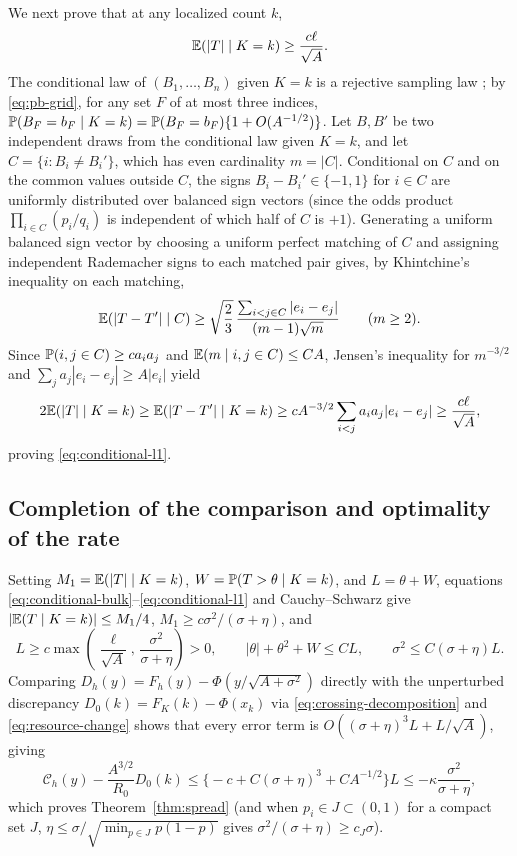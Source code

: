 We next prove that at any localized count $k$,
\begin{equation}\label{eq:conditional-l1}
                   \mathbb E(|T|\mid K=k)\ge \frac{c\ell}{\sqrt A}.
\end{equation}
The conditional law of $(B_1,\ldots,B_n)$ given $K=k$ is a rejective
sampling law \citep[Section~2]{BoistardLopuhaaRuizGazen2012}; by
\eqref{eq:pb-grid}, for any set $F$ of at most three indices,
$\mathbb P(B_F=b_F\mid K=k)=\mathbb P(B_F=b_F)\{1+O(A^{-1/2})\}$. Let $B,B'$ be two
independent draws from the conditional law given $K=k$, and let
$C=\{i:B_i\ne B_i'\}$, which has even cardinality $m=|C|$. Conditional on
$C$ and on the common values outside $C$, the signs $B_i-B_i'\in\{-1,1\}$ for
$i\in C$ are uniformly distributed over balanced sign vectors (since the
odds product $\prod_{i\in C}(p_i/q_i)$ is independent of which half of $C$ is
$+1$). Generating a uniform balanced sign vector by choosing a uniform
perfect matching of $C$ and assigning independent Rademacher signs to each
matched pair gives, by Khintchine's inequality on each matching,
\[
 \mathbb E(|T-T'|\mid C)
 \ge\sqrt{\frac23}\,
       \frac{\sum_{i<j\in C}|e_i-e_j|}{(m-1)\sqrt m}\qquad(m\ge2).
\]
Since $\mathbb P(i,j\in C)\ge ca_ia_j$ and $\mathbb E(m\mid i,j\in C)\le CA$, Jensen's
inequality for $m^{-3/2}$ and $\sum_ja_j|e_i-e_j|\ge A|e_i|$ yield
\[
 2\mathbb E(|T|\mid K=k)\ge\mathbb E(|T-T'|\mid K=k)
 \ge cA^{-3/2}\sum_{i<j}a_ia_j|e_i-e_j|
 \ge \frac{c\ell}{\sqrt A},
\]
proving \eqref{eq:conditional-l1}.

\subsection{Completion of the comparison and optimality of the rate}

Setting $M_1=\mathbb E(|T|\mid K=k)$, $W=\mathbb P(T>\theta\mid K=k)$, and $L=\theta+W$,
equations \eqref{eq:conditional-bulk}--\eqref{eq:conditional-l1} and Cauchy--Schwarz
give $|\mathbb E(T\mid K=k)|\le M_1/4$, $M_1\ge c\sigma^2/(\sigma+\eta)$, and
\begin{equation}\label{eq:relative-phase}
 L\ge c\max\left(\frac\ell{\sqrt A},\,
                      \frac{\sigma^2}{\sigma+\eta}\right)>0,
 \qquad |\theta|+\theta^2+W\le CL,
 \qquad\sigma^2\le C(\sigma+\eta)L.
\end{equation}
Comparing $D_h(y)=F_h(y)-\Phi(y/\sqrt{A+\sigma^2})$ directly with the
unperturbed discrepancy $D_0(k)=F_K(k)-\Phi(x_k)$ via \eqref{eq:crossing-decomposition}
and \eqref{eq:resource-change} shows that every error term is $O((\sigma+\eta)^3L+L/\sqrt A)$,
giving
\[
 \mathcal C_h(y)-\frac{A^{3/2}}{R_0}D_0(k)
 \le\bigl\{-c+C(\sigma+\eta)^3+CA^{-1/2}\bigr\}L
 \le-\kappa\frac{\sigma^2}{\sigma+\eta},
\]
which proves Theorem~\ref{thm:spread} (and when $p_i\in J\subset(0,1)$ for a
compact set $J$, $\eta\le\sigma/\sqrt{\min_{p\in J}p(1-p)}$ gives
$\sigma^2/(\sigma+\eta)\ge c_J\sigma$).

